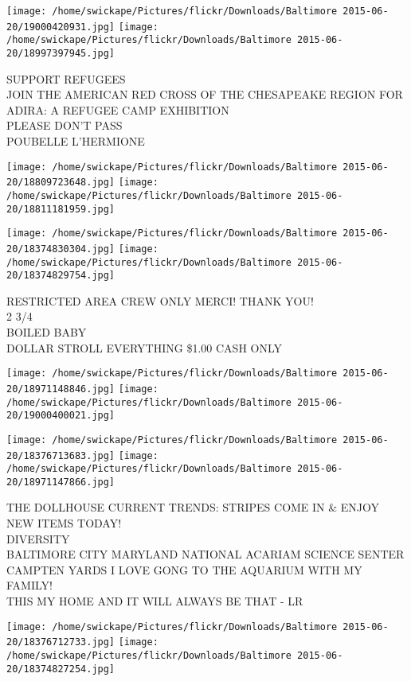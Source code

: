 \documentclass[10pt,letterpaper]{article}
\begin{document}
\texttt{[image: /home/swickape/Pictures/flickr/Downloads/Baltimore 2015-06-20/19000420931.jpg]}
\texttt{[image: /home/swickape/Pictures/flickr/Downloads/Baltimore 2015-06-20/18997397945.jpg]}

SUPPORT REFUGEES\\
JOIN THE AMERICAN RED CROSS OF THE CHESAPEAKE REGION FOR ADIRA: A REFUGEE CAMP EXHIBITION\\
PLEASE DON'T PASS\\
POUBELLE L'HERMIONE
\pagebreak

\texttt{[image: /home/swickape/Pictures/flickr/Downloads/Baltimore 2015-06-20/18809723648.jpg]}
\texttt{[image: /home/swickape/Pictures/flickr/Downloads/Baltimore 2015-06-20/18811181959.jpg]}

\texttt{[image: /home/swickape/Pictures/flickr/Downloads/Baltimore 2015-06-20/18374830304.jpg]}
\texttt{[image: /home/swickape/Pictures/flickr/Downloads/Baltimore 2015-06-20/18374829754.jpg]}

RESTRICTED AREA CREW ONLY MERCI!  THANK YOU!\\
2 3/4\\
BOILED BABY\\
DOLLAR STROLL EVERYTHING \$1.00 CASH ONLY
\pagebreak

\texttt{[image: /home/swickape/Pictures/flickr/Downloads/Baltimore 2015-06-20/18971148846.jpg]}
\texttt{[image: /home/swickape/Pictures/flickr/Downloads/Baltimore 2015-06-20/19000400021.jpg]}

\texttt{[image: /home/swickape/Pictures/flickr/Downloads/Baltimore 2015-06-20/18376713683.jpg]}
\texttt{[image: /home/swickape/Pictures/flickr/Downloads/Baltimore 2015-06-20/18971147866.jpg]}

THE DOLLHOUSE CURRENT TRENDS: STRIPES COME IN \& ENJOY NEW ITEMS TODAY!\\
DIVERSITY\\
BALTIMORE CITY MARYLAND NATIONAL ACARIAM SCIENCE SENTER CAMPTEN YARDS I LOVE GONG TO THE AQUARIUM WITH MY FAMILY!\\
THIS MY HOME AND IT WILL ALWAYS BE THAT {-} LR
\pagebreak

\texttt{[image: /home/swickape/Pictures/flickr/Downloads/Baltimore 2015-06-20/18376712733.jpg]}
\texttt{[image: /home/swickape/Pictures/flickr/Downloads/Baltimore 2015-06-20/18374827254.jpg]}
\end{document}

